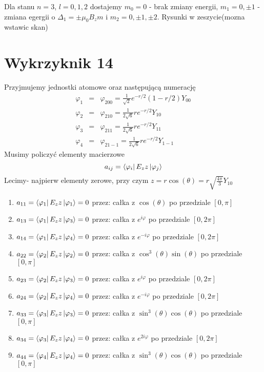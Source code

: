 \documentclass[a4paper,12pt]{article}
\begin{document}
Dla stanu $n=3$, $l=0, 1, 2$ dostajemy $m_0 = 0$ - brak zmiany energii, $m_1 = 0, \pm1$ - zmiana egergii o $\Delta_1 = \pm \mu_0 B_z m$ i $m_2 = 0, \pm 1, \pm 2$. Rysunki w zeszycie(mozna wstawic skan)

\section{Wykrzyknik 14}
	Przyjmujemy jednostki atomowe oraz następującą numerację 
		$$
		\begin{array}{lll}
			\varphi_1 &=& \varphi_{200} = \frac{1}{\sqrt{2}}e^{-r/2}\left(1-r/2\right)Y_{00}\\
			\varphi_2 &=& \varphi_{210} = \frac{1}{2\sqrt{6}}re^{-r/2}Y_{10}\\
			\varphi_3 &=& \varphi_{211} = \frac{1}{2\sqrt{6}}re^{-r/2}Y_{11}\\
			\varphi_4 &=& \varphi_{21-1}= \frac{1}{2\sqrt{6}}re^{-r/2}Y_{1-1}
		\end{array}
		$$
	Musimy policzyć elementy macierzowe 
		$$
		a_{ij} = \bra{\varphi_i}E_z z\ket{\varphi_j}
		$$
	Lecimy- najpierw elementy zerowe, przy czym  $z = r\cos(\theta) = r\sqrt{\frac{4\pi}{3}}Y_{10}$
		\begin{enumerate}
			\item  $a_{11} = \bra{\varphi_1}E_z z\ket{\varphi_1} = 0$ przez: całka z $\cos(\theta)$ po przedziale $[0,\pi]$ 
			\item $a_{13} = \bra{\varphi_1}E_z z\ket{\varphi_3} = 0$ przez: całka z $e^{i\varphi}$ po przedziale $[0,2\pi]$
			\item $a_{14} = \bra{\varphi_1}E_z z\ket{\varphi_4} =0 $ przez:  całka z $e^{-i\varphi}$ po przedziale $[0,2\pi]$
			\item $a_{22} = \bra{\varphi_2}E_z z\ket{\varphi_2} = 0$ przez: całka z $\cos^3(\theta)\sin(\theta)$ po przedziale $[0,\pi]$ 
			\item $a_{23} = \bra{\varphi_2}E_z z\ket{\varphi_3} = 0$ przez: całka z $e^{i\varphi}$ po przedziale $[0,2\pi]$
			\item $a_{24} = \bra{\varphi_2}E_z z\ket{\varphi_4} = 0$ przez: całka z $e^{-i\varphi}$ po przedziale $[0,2\pi]$
			\item $a_{33} = \bra{\varphi_3}E_z z\ket{\varphi_3} = 0$ przez: całka z $\sin^3(\theta)\cos(\theta)$ po przedziale $[0,\pi]$
			\item $a_{34} = \bra{\varphi_3}E_z z\ket{\varphi_4} = 0$ przez: całka z $e^{2i\varphi}$ po przedziale $[0,2\pi]$
			\item $a_{44} = \bra{\varphi_4}E_z z\ket{\varphi_4} = 0$ przez: całka z $\sin^3(\theta)\cos(\theta)$ po przedziale $[0,\pi]$
		\end{enumerate}
\end{document}

